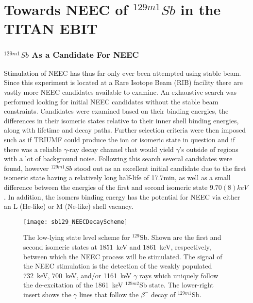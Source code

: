 \documentclass[jon_ringuette_thesis_proposal.tex]{subfiles}
\begin{document}
    \chapter{Towards NEEC of $^{129m1}Sb$ in the TITAN EBIT}

    \subsection{$^{129m1}Sb$ As a Candidate For NEEC}
    Stimulation of NEEC has thus far only ever been attempted using stable beam.
    Since this experiment is located at a Rare Isotope Beam (RIB) facility there are vastly more NEEC candidates available to examine.
    An exhaustive search was performed looking for initial NEEC candidates without the stable beam constraints.
    Candidates were examined based on their binding energies, the differences in their isomeric states relative to their inner shell binding energies, along with lifetime and decay paths.
    Further selection criteria were then imposed such as if TRIUMF could produce the ion or isomeric state in question and if there was a reliable $\gamma$-ray decay channel that would yield $\gamma$'s outside of regions with a lot of background noise.
    Following this search several candidates were found, however $^{129m1}Sb$ stood out as an excellent initial candidate due to the first isomeric state having a relatively long half-life of 17.7min, as well as a small difference between the energies of the first and second isomeric state $9.70(8)keV$.
    In addition, the isomers binding energy has the potential for NEEC via either an L (He-like) or M (Ne-like) shell vacancy.

    \begin{figure}[H]
        \begin{center}
            \texttt{[image: sb129\_NEECDecayScheme]}
        \end{center}
        \caption{\small The low-lying state level scheme for $^{129}$Sb. Shown are the first and second isomeric states at 1851~keV and 1861~keV, respectively, between which the NEEC process will be stimulated. The signal of the NEEC stimulation is the detection of the weakly populated 732~keV, 700~keV, and/or 1161~keV $\gamma$ rays which uniquely follow the de-excitation of the 1861~keV $^{129m2}$Sb state. The lower-right insert shows the $\gamma$ lines that follow the $\beta^-$ decay of $^{129m1}$Sb. \cite{eec_SOP_NEEC}}
        \label{fig:sb129_neec_decay_scheme}
    \end{figure}
\end{document}
